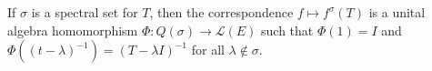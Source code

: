 If $\sigma$ is a spectral set for $T$, then the correspondence $f \mapsto f^\sigma(T)$ is a unital algebra homomorphism $\Phi: Q(\sigma) \to \mathcal{L}(E)$ such that $\Phi(1) = I$ and $\Phi((t - \lambda)^{-1}) = (T - \lambda I)^{-1}$ for all $\lambda \notin \sigma$.
